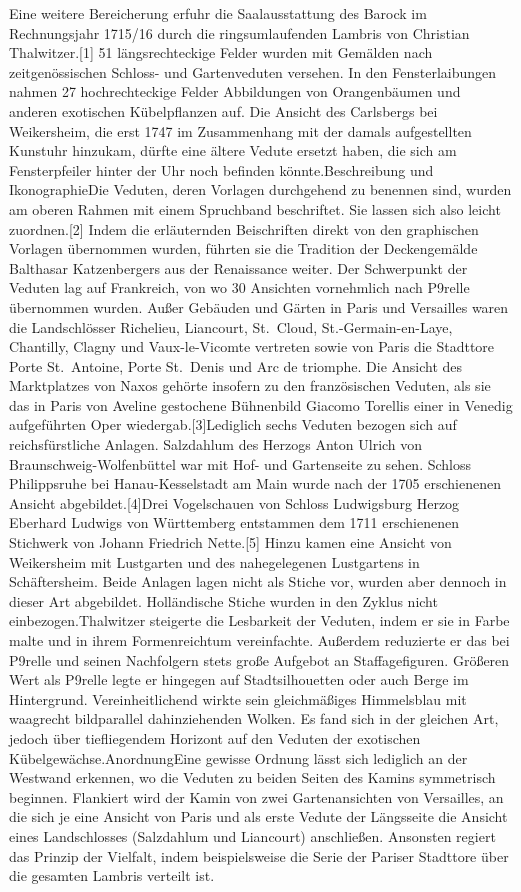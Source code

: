 \documentclass[
  a4paper,
]{book}
\begin{document}
Eine weitere Bereicherung erfuhr die Saalausstattung des Barock im
Rechnungsjahr 1715/16 durch die ringsumlaufenden Lambris von Christian
Thalwitzer.{[}1{]} 51 längsrechteckige Felder wurden mit Gemälden nach
zeitgenössischen Schloss- und Gartenveduten versehen. In den
Fensterlaibungen nahmen 27 hochrechteckige Felder Abbildungen von
Orangenbäumen und anderen exotischen Kübelpflanzen auf. Die Ansicht des
Carlsbergs bei Weikersheim, die erst 1747 im Zusammenhang mit der damals
aufgestellten Kunstuhr hinzukam, dürfte eine ältere Vedute ersetzt
haben, die sich am Fensterpfeiler hinter der Uhr noch befinden
könnte.Beschreibung und IkonographieDie Veduten, deren Vorlagen
durchgehend zu benennen sind, wurden am oberen Rahmen mit einem
Spruchband beschriftet. Sie lassen sich also leicht zuordnen.{[}2{]}
Indem die erläuternden Beischriften direkt von den graphischen Vorlagen
übernommen wurden, führten sie die Tradition der Deckengemälde Balthasar
Katzenbergers aus der Renaissance weiter. Der Schwerpunkt der Veduten
lag auf Frankreich, von wo 30 Ansichten vornehmlich nach P\xa9relle
übernommen wurden. Außer Gebäuden und Gärten in Paris und Versailles
waren die Landschlösser Richelieu, Liancourt, St.~Cloud,
St.-Germain-en-Laye, Chantilly, Clagny und Vaux-le-Vicomte vertreten
sowie von Paris die Stadttore Porte St.~Antoine, Porte St.~Denis und Arc
de triomphe. Die Ansicht des Marktplatzes von Naxos gehörte insofern zu
den französischen Veduten, als sie das in Paris von Aveline gestochene
Bühnenbild Giacomo Torellis einer in Venedig aufgeführten Oper
wiedergab.{[}3{]}Lediglich sechs Veduten bezogen sich auf
reichsfürstliche Anlagen. Salzdahlum des Herzogs Anton Ulrich von
Braunschweig-Wolfenbüttel war mit Hof- und Gartenseite zu sehen. Schloss
Philippsruhe bei Hanau-Kesselstadt am Main wurde nach der 1705
erschienenen Ansicht abgebildet.{[}4{]}Drei Vogelschauen von Schloss
Ludwigsburg Herzog Eberhard Ludwigs von Württemberg entstammen dem 1711
erschienenen Stichwerk von Johann Friedrich Nette.{[}5{]} Hinzu kamen
eine Ansicht von Weikersheim mit Lustgarten und des nahegelegenen
Lustgartens in Schäftersheim. Beide Anlagen lagen nicht als Stiche vor,
wurden aber dennoch in dieser Art abgebildet. Holländische Stiche wurden
in den Zyklus nicht einbezogen.Thalwitzer steigerte die Lesbarkeit der
Veduten, indem er sie in Farbe malte und in ihrem Formenreichtum
vereinfachte. Außerdem reduzierte er das bei P\xa9relle und seinen
Nachfolgern stets große Aufgebot an Staffagefiguren. Größeren Wert als
P\xa9relle legte er hingegen auf Stadtsilhouetten oder auch Berge im
Hintergrund. Vereinheitlichend wirkte sein gleichmäßiges Himmelsblau mit
waagrecht bildparallel dahinziehenden Wolken. Es fand sich in der
gleichen Art, jedoch über tiefliegendem Horizont auf den Veduten der
exotischen Kübelgewächse.AnordnungEine gewisse Ordnung lässt sich
lediglich an der Westwand erkennen, wo die Veduten zu beiden Seiten des
Kamins symmetrisch beginnen. Flankiert wird der Kamin von zwei
Gartenansichten von Versailles, an die sich je eine Ansicht von Paris
und als erste Vedute der Längsseite die Ansicht eines Landschlosses
(Salzdahlum und Liancourt) anschließen. Ansonsten regiert das Prinzip
der Vielfalt, indem beispielsweise die Serie der Pariser Stadttore über
die gesamten Lambris verteilt ist.
\end{document}
